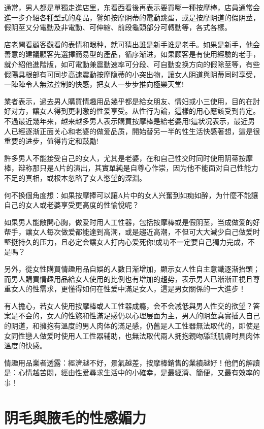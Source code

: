 \documentclass[12pt,UTF8]{ctexbook}
\begin{document}
通常，男人都是單獨走進店里，东看西看後再表示要買哪一種按摩棒，店員通常会進一步介紹各種型式的產品，譬如按摩阴蒂的電動跳蛋，或是按摩阴道的假阴莖，假阴莖又分電動及非電動、可伸縮、前段龜頭部分可轉動等，各式各樣。

店老閪看顧客觀看的表情和眼种，就可猜出誰是新手谁是老手。如果是新手，他会善意的建議顧客先選擇簡易型的產品，循序渐进，如果顾客是有使用經驗的老手，就介紹他進階版，如可電動兼震動速率可分段、可自動变换方向的假除莖等，有些假陽具根部有可同步高速震動按摩隐蒂的小突出物，讓女人阴道與阴蒂同时享受，一陣陣令人無法控制的快感，把女人一步步推向極樂天堂!

業者表示，過去男人購買情趣用品幾乎都是給女朋友、情妇或小三使用，目的在討好对方，讓女人得到更刺激的性爱享受。从性行为論，這樣的用心應該受到肯定。不過最近幾年来，越来越多男人表示購買按摩棒是給老婆用!這状况表示，最近男人已經逐渐正面关心和老婆的做爱品质，開始替另一半的性生活快感著想，這是很重要的进步，值得肯定和鼓勵!

許多男人不能接受自己的女人，尤其是老婆，在和自己性交时同时使用阴蒂按摩棒，辩称那只是A片的演出，其實單純是自尊心作崇，因为他不能面对自己性能力不足的真相，或根本忽略了女人慾望的深淵。

何不换個角度想：如果按摩捧可以讓A片中的女人兴奮到如痴如醉，为什麼不能讓自己的女人或老婆享受更高度的性愉悅呢？

如果男人能敞開心胸，做爱时用人工性器，包括按摩棒或是假阴茎，当成做爱的好帮手，讓女人每次做爱都能達到高潮，或是趨近高潮，不但可大大減少自己做爱时堅挺持久的压力，且必定会讓女人打内心爱死你!成功不一定要自己獨力完成，不是嗎？

另外，從女性購買情趣用品自娛的人數日渐增加，顯示女人性自主意識逐渐抬頭；而男人購買情趣用品給女人使用的比例也有增加的趨势，表示男人已漸漸正視且尊重女人的性需求，更懂得如何在性爱中滿足女人，這是男女關係的一大進步！

有人擔心，若女人使用按摩棒或人工性器成瘾，会不会减低與男人性交的欲望？答案是不会的，女人的性慾和性滿足感仍以心理层面为主，男人的阴莖真實插入自己的阴道，和擁抱有溫度的男人肉体的滿足感，仍舊是人工性器無法取代的，即使是女同性戀人做爱时使用人工性器辅助，也無法取代兩人拥抱親吻舔舐肌膚时具肉体溫度的快感。

情趣用品業者透露：經濟越不好，景氣越差，按摩棒銷售的業績越好！他們的解讀是：心情越苦悶，經由性爱尋求生活中的小確幸，是最經濟、簡便，又最有效率的事！

\chapter{阴毛與腋毛的性感媚力}
\end{document}
